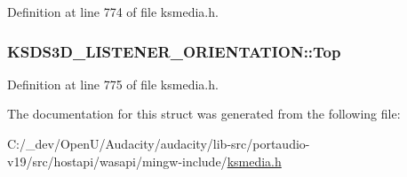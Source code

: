 Definition at line 774 of file ksmedia.\+h.

\subsubsection[{\texorpdfstring{Top}{Top}}]{ K\+S\+D\+S3\+D\+\_\+\+L\+I\+S\+T\+E\+N\+E\+R\+\_\+\+O\+R\+I\+E\+N\+T\+A\+T\+I\+O\+N\+::\+Top}\hypertarget{struct_k_s_d_s3_d___l_i_s_t_e_n_e_r___o_r_i_e_n_t_a_t_i_o_n_ad155615c52991f91dbb57b1a1d57b408}{}\label{struct_k_s_d_s3_d___l_i_s_t_e_n_e_r___o_r_i_e_n_t_a_t_i_o_n_ad155615c52991f91dbb57b1a1d57b408}


Definition at line 775 of file ksmedia.\+h.



The documentation for this struct was generated from the following file\+:\begin{DoxyCompactItemize}
\item 
C\+:/\+\_\+dev/\+Open\+U/\+Audacity/audacity/lib-\/src/portaudio-\/v19/src/hostapi/wasapi/mingw-\/include/\hyperlink{ksmedia_8h}{ksmedia.\+h}\end{DoxyCompactItemize}
